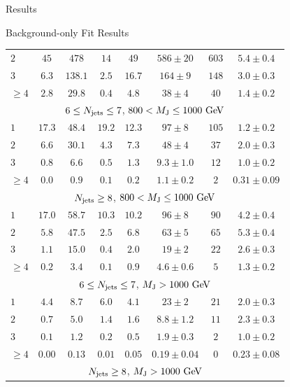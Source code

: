 \begin{section}{Results}
\begin{subsection}{Background-only Fit Results}
\begin{table}
\begin{tabular}[tbp!]{ l | c  c  c  c | c |  c | c  }
$2$       &  $45$    &  $478$   &  $14$    &  $49$    &  $586\pm20$     &  $603$   &  $5.4 \pm 0.4$   \\
$3$       &  $6.3$   &  $138.1$ &  $2.5$   &  $16.7$  &  $164\pm9$      &  $148$   &  $3.0 \pm 0.3$   \\
$\geq 4$  &  $2.8$   &  $29.8$  &  $0.4$   &  $4.8$   &  $38\pm4$       &  $40$    &  $1.4 \pm 0.2$   \\
\hline
\multicolumn{8}{c}{$6 \leq N_{\mathrm{jets}} \leq 7$, $800 < M_{\mathrm{J}} \leq 1000~\mathrm{Ge\kern -0.1em V}$} \\
\hline
$1$       &  $17.3$  &  $48.4$  &  $19.2$  &  $12.3$  &  $97\pm8$       &  $105$   &  $1.2 \pm 0.2$   \\
$2$       &  $6.6$   &  $30.1$  &  $4.3$   &  $7.3$   &  $48\pm4$       &  $37$    &  $2.0 \pm 0.3$   \\
$3$       &  $0.8$   &  $6.6$   &  $0.5$   &  $1.3$   &  $9.3\pm1.0$    &  $12$    &  $1.0 \pm 0.2$   \\
$\geq 4$  &  $0.0$   &  $0.9$   &  $0.1$   &  $0.2$   &  $1.1\pm0.2$    &  $2$     &  $0.31 \pm 0.09$ \\
\hline
\multicolumn{8}{c}{$N_{\mathrm{jets}} \geq 8$, $800 < M_{\mathrm{J}} \leq 1000~\mathrm{Ge\kern -0.1em V}$} \\
\hline
$1$       &  $17.0$  &  $58.7$  &  $10.3$  &  $10.2$  &  $96\pm8$       &  $90$    &  $4.2 \pm 0.4$   \\
$2$       &  $5.8$   &  $47.5$  &  $2.5$   &  $6.8$   &  $63\pm5$       &  $65$    &  $5.3 \pm 0.4$   \\
$3$       &  $1.1$   &  $15.0$  &  $0.4$   &  $2.0$   &  $19\pm2$       &  $22$    &  $2.6 \pm 0.3$   \\
$\geq 4$  &  $0.2$   &  $3.4$   &  $0.1$   &  $0.9$   &  $4.6\pm0.6$    &  $5$     &  $1.3 \pm 0.2$   \\
\hline
\multicolumn{8}{c}{$6 \leq N_{\mathrm{jets}} \leq 7$, $M_{\mathrm{J}} > 1000~\mathrm{Ge\kern -0.1em V}$} \\
\hline
$1$       &  $4.4$   &  $8.7$   &  $6.0$  &  $4.1$  &  $23\pm2$         &  $21$    &  $2.0 \pm 0.3$   \\
$2$       &  $0.7$   &  $5.0$   &  $1.4$  &  $1.6$  &  $8.8\pm1.2$      &  $11$    &  $2.3 \pm 0.3$   \\
$3$       &  $0.1$   &  $1.2$   &  $0.2$  &  $0.5$  &  $1.9\pm0.3$      &  $2$     &  $1.0 \pm 0.2$   \\
$\geq 4$  &  $0.00$  &  $0.13$  &  $0.01$ &  $0.05$ &  $0.19\pm0.04$    &  $0$     &  $0.23 \pm 0.08$ \\
\hline
\multicolumn{8}{c}{$N_{\mathrm{jets}} \geq 8$, $M_{\mathrm{J}} > 1000~\mathrm{Ge\kern -0.1em V}$} \\

\end{tabular}
\end{table}
\end{subsection}
\end{section}
